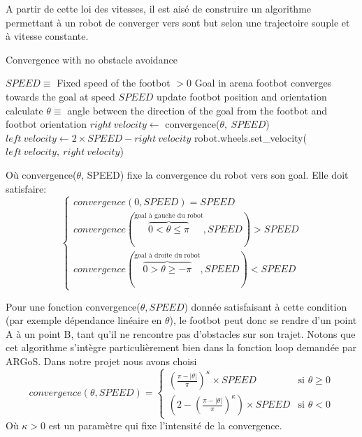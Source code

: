A partir de cette loi des vitesses, il est aisé de construire un algorithme permettant à un robot de converger vers sont but selon une trajectoire souple et à vitesse constante.
\begin{algorithm}                    
\caption{Convergence with no obstacle avoidance}
\label{simpleConvergence}
\begin{algorithmic}[1]
  \REQUIRE \(SPEED \equiv \) Fixed speed of the footbot \(> 0\)
  \REQUIRE Goal in arena
  \ENSURE footbot converges towards the goal at speed \(SPEED\)
    \STATE update footbot position and orientation
    \STATE calculate \( \theta \equiv\) angle between the direction of the goal from the footbot and footbot orientation
    \STATE \( right\:velocity \leftarrow\) convergence(\(\theta,\:SPEED\))
    \STATE \( left\:velocity \leftarrow 2 \times SPEED-right\:velocity\) 
    \STATE robot.wheels.set\_velocity(\(left\:velocity,\:right\:velocity\))
  \ENDWHILE
\end{algorithmic}
\end{algorithm}

Où convergence(\(\theta\), SPEED) fixe la convergence du robot vers son goal. Elle doit satisfaire:
\begin{equation}
  \begin{cases}
    convergence(0,SPEED)=SPEED\\
    convergence(\overset{\text{goal à gauche du robot}}{\overbrace{0<\theta\leq\pi}},SPEED)>SPEED\\
    convergence(\overset{\text{goal à droite du robot}}{\overbrace{0>\theta\geq-\pi}},SPEED)<SPEED
  \end{cases}
\end{equation}

Pour une fonction convergence(\(\theta, SPEED\)) donnée satisfaisant à cette condition (par exemple dépendance linéaire en \(\theta\)), le footbot peut donc se rendre d'un point A à un point B, tant qu'il ne rencontre pas d'obstacles sur son trajet. Notons que cet algorithme s'intègre particulièrement bien dans la fonction loop demandée par ARGoS. Dans notre projet nous avons choisi
\[
convergence(\theta, SPEED)=
\begin{cases}
      { \left( \frac{\pi- \lvert \theta \rvert }{\pi} \right)}^{\kappa} \times SPEED & \text{si } \theta \geq 0\\
      \left( 2 - { \left( \frac{\pi- \lvert \theta \rvert }{\pi} \right) }^{\kappa} \right) \times SPEED & \text{si } \theta < 0
\end{cases}
\]
Où $\kappa > 0$ est un paramètre qui fixe l'intensité de la convergence.

